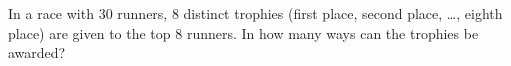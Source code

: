 In a race with $30$ runners, $8$ distinct trophies (first place, second place, \ldots, eighth place) are given to the top $8$ runners. In how many ways can the trophies be awarded?
